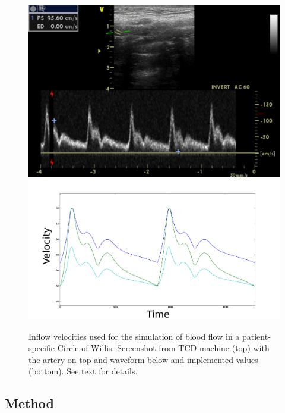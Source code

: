 \begin{figure}
  \centering
  \includegraphics[width=\largefig]{chapters/kvs-2/pdf/ica.pdf} \\
  \includegraphics[width=\largefig]{chapters/kvs-2/pdf/cok_inflow.pdf}
  \caption{Inflow velocities used for the simulation of blood flow in
    a patient-specific Circle of Willis. Screenshot from TCD machine
    (top) with the artery on top and waveform below and implemented
    values (bottom). See text for details.}
  \label{fig:kvs-2:cok_inflow}
\end{figure}

\subsection{Method}

